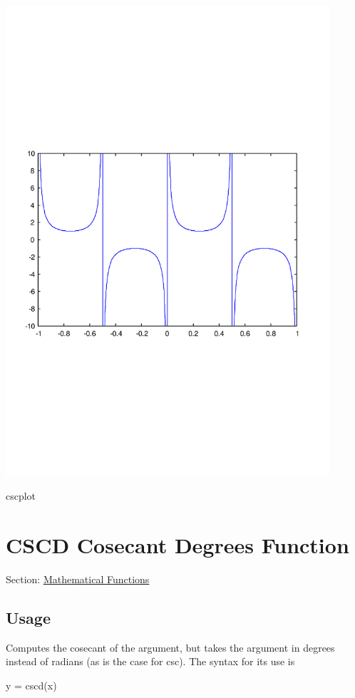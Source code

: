  
\begin{DoxyImage}
\includegraphics[width=12cm]{cscplot}
\caption{cscplot}
\end{DoxyImage}
 \hypertarget{mathfunctions_cscd}{}\section{C\-S\-C\-D Cosecant Degrees Function}\label{mathfunctions_cscd}
Section\-: \hyperlink{sec_mathfunctions}{Mathematical Functions} \hypertarget{vtkwidgets_vtkxyplotwidget_Usage}{}\subsection{Usage}\label{vtkwidgets_vtkxyplotwidget_Usage}
Computes the cosecant of the argument, but takes the argument in degrees instead of radians (as is the case for {\ttfamily csc}). The syntax for its use is \begin{DoxyVerb}   y = cscd(x)
\end{DoxyVerb}
